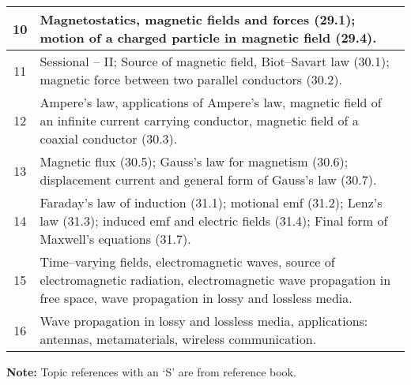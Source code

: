\documentclass[12pt,a4paper]{article}
\begin{document}
\begin{center}
\begin{longtable}{|c|p{13cm}|}
		\hline
		10 \rule{0pt}{2.6ex} & Magnetostatics, magnetic fields and forces (29.1); motion of a charged particle in magnetic field (29.4).\\
		\hline
		11 \rule{0pt}{2.6ex} & Sessional -- II; Source of magnetic field, Biot--Savart law (30.1); magnetic force between two parallel conductors (30.2).\\
		\hline
		12 \rule{0pt}{2.6ex} & Ampere's law, applications of Ampere's law, magnetic field of an infinite current carrying conductor, magnetic field of a coaxial conductor (30.3).\\
		\hline
		13 \rule{0pt}{2.6ex} & Magnetic flux (30.5); Gauss's law for magnetism (30.6); displacement current and general form of Gauss's law (30.7).\\
		\hline
		14 \rule{0pt}{2.6ex} & Faraday's law of induction (31.1); motional emf (31.2); Lenz's law (31.3); induced emf and electric fields (31.4); Final form of Maxwell's equations (31.7).\\
		\hline
		15 \rule{0pt}{2.6ex} & Time--varying fields, electromagnetic waves, source of electromagnetic radiation, electromagnetic wave propagation in free space, wave propagation in lossy and lossless media.\\
		\hline
		16 \rule{0pt}{2.6ex} & Wave propagation in lossy and lossless media, applications: antennas, metamaterials, wireless communication.\\
	\hline \hline
	\end{longtable}
\end{center}
\noindent \textbf{Note:} Topic references with an `S' are from reference book.
\end{document}
